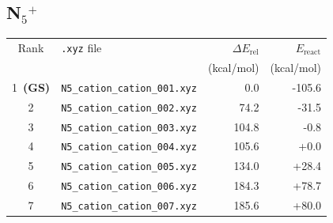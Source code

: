 \documentclass[11pt,a4paper]{article}
\begin{document}
\subsection*{N$_{5}$$^{+}$}
\begin{longtable}{clrr}
\toprule
Rank & \texttt{.xyz} file & $\Delta E_\text{rel}$ & $E_\text{react}$ \\
 & & (kcal/mol) & (kcal/mol) \\
\midrule\endhead
\rowcolor{gs}1~\textbf{(GS)} & \texttt{N5\_cation\_cation\_001.xyz} & 0.0 & -105.6 \\
2 & \texttt{N5\_cation\_cation\_002.xyz} & 74.2 & -31.5 \\
3 & \texttt{N5\_cation\_cation\_003.xyz} & 104.8 & -0.8 \\
4 & \texttt{N5\_cation\_cation\_004.xyz} & 105.6 & +0.0 \\
5 & \texttt{N5\_cation\_cation\_005.xyz} & 134.0 & +28.4 \\
6 & \texttt{N5\_cation\_cation\_006.xyz} & 184.3 & +78.7 \\
7 & \texttt{N5\_cation\_cation\_007.xyz} & 185.6 & +80.0 \\
\bottomrule
\end{longtable}
\end{document}
